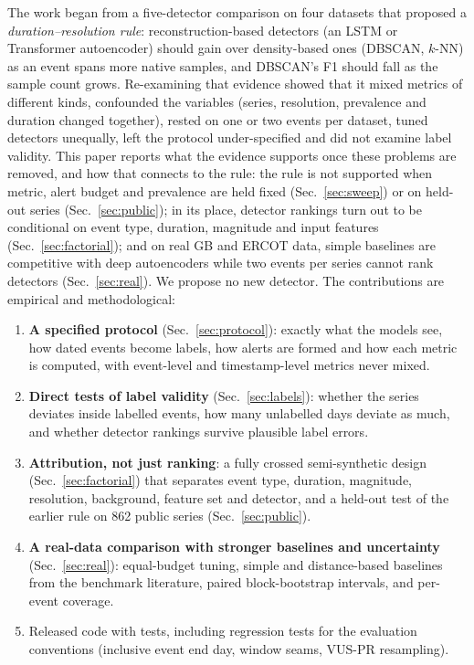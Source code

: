 \documentclass[10pt,twocolumn]{article}
\begin{document}
The work began from a five-detector comparison on four datasets that proposed a \emph{duration--resolution rule}: reconstruction-based detectors (an LSTM or Transformer autoencoder) should gain over density-based ones (DBSCAN, $k$-NN) as an event spans more native samples, and DBSCAN's F1 should fall as the sample count grows. Re-examining that evidence showed that it mixed metrics of different kinds, confounded the variables (series, resolution, prevalence and duration changed together), rested on one or two events per dataset, tuned detectors unequally, left the protocol under-specified and did not examine label validity. This paper reports what the evidence supports once these problems are removed, and how that connects to the rule: the rule is not supported when metric, alert budget and prevalence are held fixed (Sec.~\ref{sec:sweep}) or on held-out series (Sec.~\ref{sec:public}); in its place, detector rankings turn out to be conditional on event type, duration, magnitude and input features (Sec.~\ref{sec:factorial}); and on real GB and ERCOT data, simple baselines are competitive with deep autoencoders while two events per series cannot rank detectors (Sec.~\ref{sec:real}). We propose no new detector. The contributions are empirical and methodological:
\begin{enumerate}
\item \textbf{A specified protocol} (Sec.~\ref{sec:protocol}): exactly what the models see, how dated events become labels, how alerts are formed and how each metric is computed, with event-level and timestamp-level metrics never mixed.
\item \textbf{Direct tests of label validity} (Sec.~\ref{sec:labels}): whether the series deviates inside labelled events, how many unlabelled days deviate as much, and whether detector rankings survive plausible label errors.
\item \textbf{Attribution, not just ranking}: a fully crossed semi-synthetic design (Sec.~\ref{sec:factorial}) that separates event type, duration, magnitude, resolution, background, feature set and detector, and a held-out test of the earlier rule on 862 public series (Sec.~\ref{sec:public}).
\item \textbf{A real-data comparison with stronger baselines and uncertainty} (Sec.~\ref{sec:real}): equal-budget tuning, simple and distance-based baselines from the benchmark literature, paired block-bootstrap intervals, and per-event coverage.
\item Released code with tests, including regression tests for the evaluation conventions (inclusive event end day, window seams, VUS-PR resampling).
\end{enumerate}
\end{document}
